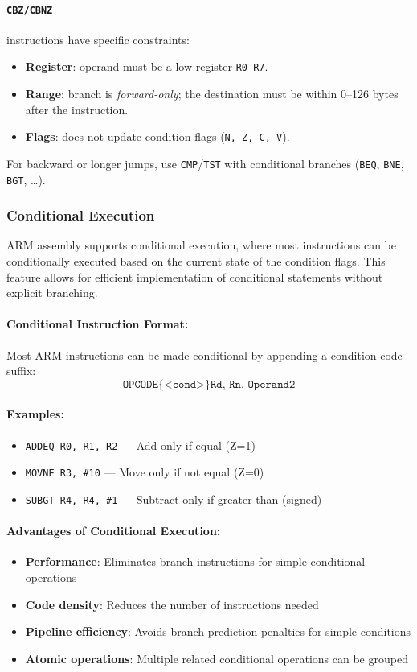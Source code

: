 \paragraph{\texttt{CBZ/CBNZ}} instructions have specific constraints:
\begin{itemize}[nosep]
  \item \textbf{Register}: operand must be a low register \texttt{R0--R7}.
  \item \textbf{Range}: branch is \emph{forward-only}; the destination must be within 0--126 bytes after the instruction.
  \item \textbf{Flags}: does not update condition flags (\texttt{N, Z, C, V}).
\end{itemize}
For backward or longer jumps, use \texttt{CMP}/\texttt{TST} with conditional branches (\texttt{BEQ}, \texttt{BNE}, \texttt{BGT}, \dots).

\subsubsection{Conditional Execution}
ARM assembly supports conditional execution, where most instructions can be conditionally executed based on the current state of the condition flags. This feature allows for efficient implementation of conditional statements without explicit branching.

\paragraph{Conditional Instruction Format:}
Most ARM instructions can be made conditional by appending a condition code suffix:
\[
\texttt{OPCODE\{<cond>\} Rd, Rn, Operand2}
\]

\paragraph{Examples:}
\begin{itemize}[nosep]
    \item \texttt{ADDEQ R0, R1, R2} — Add only if equal (Z=1)
    \item \texttt{MOVNE R3, \#10} — Move only if not equal (Z=0)
    \item \texttt{SUBGT R4, R4, \#1} — Subtract only if greater than (signed)
\end{itemize}

\paragraph{Advantages of Conditional Execution:}
\begin{itemize}[nosep]
    \item \textbf{Performance}: Eliminates branch instructions for simple conditional operations
    \item \textbf{Code density}: Reduces the number of instructions needed
    \item \textbf{Pipeline efficiency}: Avoids branch prediction penalties for simple conditions
    \item \textbf{Atomic operations}: Multiple related conditional operations can be grouped
\end{itemize}
